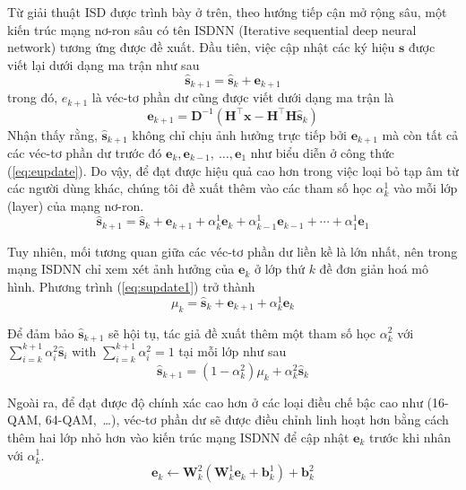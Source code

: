 Từ giải thuật ISD được trình bày ở trên, theo hướng tiếp cận mở rộng sâu, một kiến trúc mạng nơ-ron sâu có tên ISDNN (Iterative sequential deep neural network) tương ứng được đề xuất. Đầu tiên, việc cập nhật các ký hiệu $\mathbf{s}$ được viết lại dưới dạng ma trận như sau
\begin{equation}
\hat{\mathbf{s}}_{k+1}=\hat{\mathbf{s}}_k+\mathbf{e}_{k+1}
\end{equation}
trong đó, $e_{k+1}$ là véc-tơ phần dư cũng được viết dưới dạng ma trận là
\begin{equation}
    \mathbf{e}_{k+1}=\mathbf{D}^{-1}\left(\mathbf{H}^\top \mathbf{x}-\mathbf{H}^\top \mathbf{H} \hat{\mathbf{s}}_k\right)
\end{equation}
Nhận thấy rằng, $\hat{\mathbf{s}}_{k+1}$ không chỉ chịu ảnh hưởng trực tiếp bởi $\mathbf{e}_{k+1}$ mà còn tất cả các véc-tơ phần dư trước đó $\mathbf{e}_{k}, \mathbf{e}_{k-1},~\ldots, \mathbf{e}_{1}$ như biểu diễn ở công thức (\ref{eq:eupdate}). Do vậy, để đạt được hiệu quả cao hơn trong việc loại bỏ tạp âm từ các người dùng khác, chúng tôi đề xuất thêm vào các tham số học $\alpha^1_k$ vào mỗi lớp (layer) của mạng nơ-ron.
\begin{equation}
\label{eq:supdate1}
\hat{\mathbf{s}}_{k+1}=\hat{\mathbf{s}}_k+\mathbf{e}_{k+1}+\alpha_k^{1} \mathbf{e}_k+\alpha_{k-1}^{1} \mathbf{e}_{k-1}+\cdots+\alpha_1^{1} \mathbf{e}_1
\end{equation}

Tuy nhiên, mối tương quan giữa các véc-tơ phần dư liền kề là lớn nhất, nên trong mạng ISDNN chỉ xem xét ảnh hưởng của $\mathbf{e}_k$ ở lớp thứ $k$ đề đơn giản hoá mô hình. Phương trình (\ref{eq:supdate1}) trở thành 
\begin{equation}
\mu_{k}=\hat{\mathbf{s}}_k+\mathbf{e}_{k+1}+\alpha_k^1 \mathbf{e}_k
\end{equation}

Để đảm bảo $\hat{\mathbf{s}}_{k+1}$ sẽ hội tụ, tác giả đề xuất thêm một tham số học $\alpha^2_k$ với $\sum_{i=k}^{k+1} \alpha_i^{2} \hat{\mathbf{s}}_i$ with $\sum_{i=k}^{k+1} \alpha_i^{2}=1$ tại mỗi lớp như sau
\begin{equation}
\hat{\mathbf{s}}_{k+1}=\left(1-\alpha_k^2\right) \mu_k + \alpha_k^2 \hat{\mathbf{s}}_k
\end{equation}

Ngoài ra, để đạt được độ chính xác cao hơn ở các loại điều chế bậc cao như (16-QAM, 64-QAM,~\ldots), véc-tơ phần dư sẽ được điều chỉnh linh hoạt hơn bằng cách thêm hai lớp nhỏ hơn vào kiến trúc mạng ISDNN để cập nhật $\mathbf{e}_k$ trước khi nhân với $\alpha^1_k$.
\begin{equation}
\mathbf{e}_k \leftarrow \mathbf{W}^2_{k}\left(\mathbf{W}^1_{k} \mathbf{e}_k+\mathbf{b}^1_{k}\right)+\mathbf{b}^2_{k}
\end{equation}

